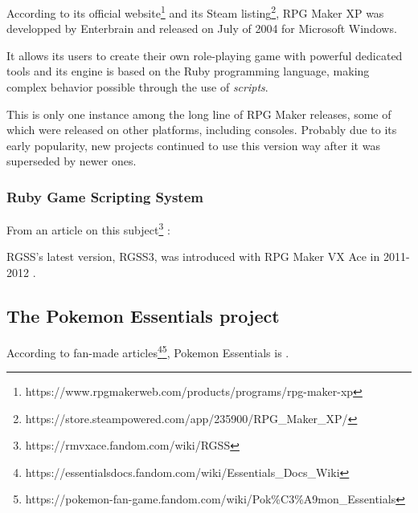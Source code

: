 \documentclass[11pt]{article}
\begin{document}
According to its official website\footnote{https://www.rpgmakerweb.com/products/programs/rpg-maker-xp} and its Steam listing\footnote{https://store.steampowered.com/app/235900/RPG\_Maker\_XP/}, RPG Maker XP was developped by Enterbrain and released on July of 2004 for Microsoft Windows. 

It allows its users to create their own role-playing game with powerful dedicated tools and its engine is based on the Ruby programming language, making complex behavior possible through the use of \textit{scripts}.


This is only one instance among the long line of RPG Maker releases, some of which were released on other platforms, including consoles. Probably due to its early popularity, new projects continued to use this version way after it was superseded by newer ones.



\subsubsection{Ruby Game Scripting System}

From an article on this subject\footnote{https://rmvxace.fandom.com/wiki/RGSS} : 


RGSS's latest version, RGSS3, was introduced with RPG Maker VX Ace in 2011-2012 \cite{rgssspec,rmvxacerelease}.






\subsection{The Pokemon Essentials project}


According to fan-made articles\footnote{https://essentialsdocs.fandom.com/wiki/Essentials\_Docs\_Wiki}\footnote{https://pokemon-fan-game.fandom.com/wiki/Pok\%C3\%A9mon\_Essentials}, Pokemon Essentials is .
\end{document}
